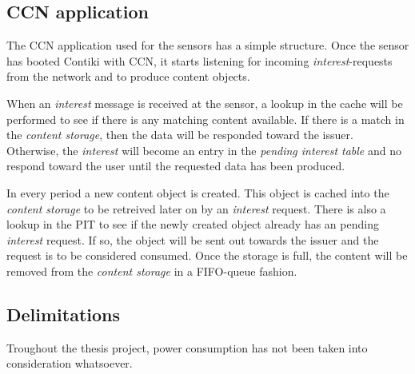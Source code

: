 \subsection{CCN application}
The CCN application used for the sensors has a simple structure. Once the sensor has booted Contiki with CCN, it starts listening for incoming \textit{interest}-requests from the network and to produce content objects.

When an \textit{interest} message is received at the sensor, a lookup in the cache will be performed to see if there is any matching content available. If there is a match in the \textit{content storage}, then the data will be responded toward the issuer. Otherwise, the \textit{interest} will become an entry in the \textit{pending interest table} and no respond toward the user until the requested data has been produced.

In every period a new content object is created. This object is cached into the \textit{content storage} to be retreived later on by an \textit{interest} request. There is also a lookup in the PIT to see if the newly created object already has an pending \textit{interest} request. If so, the object will be sent out towards the issuer and the request is to be considered consumed. Once the storage is full, the content will be removed from the \textit{content storage} in a FIFO-queue fashion.



\subsection{Delimitations}
Troughout the thesis project, power consumption has not been taken into consideration whatsoever. 




